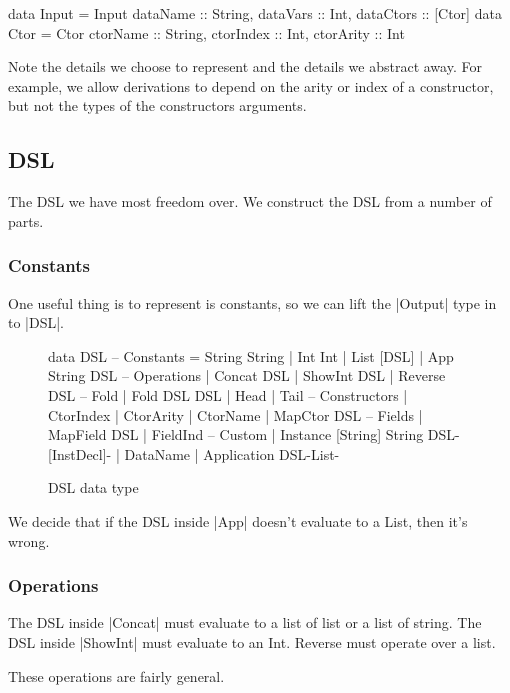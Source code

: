 \documentclass[preprint]{sigplanconf}
\begin{document}
\begin{code}
data Input = Input {dataName :: String, dataVars :: Int, dataCtors :: [Ctor]}
data Ctor = Ctor {ctorName :: String, ctorIndex :: Int, ctorArity :: Int}
\end{code}

Note the details we choose to represent and the details we abstract away. For example, we allow derivations to depend on the arity or index of a constructor, but not the types of the constructors arguments.

\subsection{DSL}

The DSL we have most freedom over. We construct the DSL from a number of parts.

\subsubsection{Constants}

One useful thing is to represent is constants, so we can lift the |Output| type in to |DSL|.

\begin{figure}
\begin{code}
data DSL
    -- Constants
    = String String
    | Int Int
    | List [DSL]
    | App String DSL
    -- Operations
    | Concat DSL
    | ShowInt DSL
    | Reverse DSL
    -- Fold
    | Fold DSL DSL
    | Head
    | Tail
    -- Constructors
    | CtorIndex
    | CtorArity
    | CtorName
    | MapCtor DSL
    -- Fields
    | MapField DSL
    | FieldInd
    -- Custom
    | Instance [String] String DSL{-[InstDecl]-}
    | DataName
    | Application DSL{-List-}
\end{code}
\caption{DSL data type}
\end{figure}

We decide that if the DSL inside |App| doesn't evaluate to a List, then it's wrong.

\subsubsection{Operations}

The DSL inside |Concat| must evaluate to a list of list or a list of string. The DSL inside |ShowInt| must evaluate to an Int. Reverse must operate over a list.

These operations are fairly general.
\end{document}
